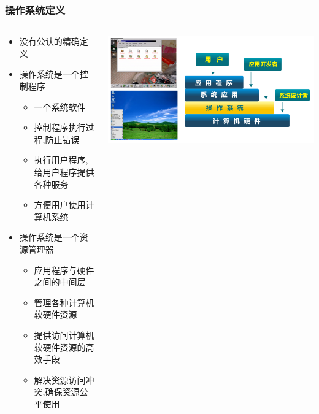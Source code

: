 \documentclass[UTF8]{ctexbeamer}
\begin{document}
\begin{frame}

\frametitle{操作系统定义}

\begin{columns}
\begin{column}{.7\linewidth}
	
\begin{itemize}
\item 没有公认的精确定义
\item 操作系统是一个控制程序
	\begin{itemize}
	\item 一个系统软件
	\item 控制程序执行过程,防止错误
	\item 执行用户程序,给用户程序提供各种服务
	\item 方便用户使用计算机系统
	\end{itemize}
	\item 操作系统是一个资源管理器
	\begin{itemize}
		\item 应用程序与硬件之间的中间层
		\item 管理各种计算机软硬件资源
		\item 提供访问计算机软硬件资源的高效手段
		\item 解决资源访问冲突,确保资源公平使用
	\end{itemize}
\end{itemize}

\end{column}

\begin{column}{.6\linewidth}

	\includegraphics[width=0.6\linewidth]{os-position}

\end{column}

\end{columns}

\end{frame}
\end{document}
